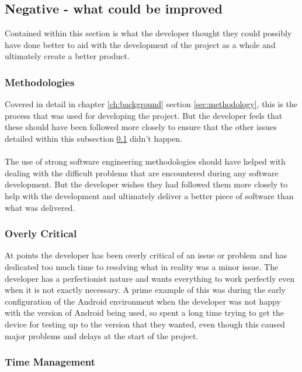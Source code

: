 \subsection{Negative - what could be improved}
\label{sec:negative_personal}

Contained within this section is what the developer thought they could possibly have done better to aid with the development of the project as a whole and ultimately create a better product. 

\subsubsection{Methodologies}

Covered in detail in chapter \ref{ch:background} section \ref{sec:methodology}, this is the process that was used for developing the project. But the developer feels that these should have been followed more closely to ensure that the other issues detailed within this subsection \ref{sec:negative_personal} didn't happen.\\
\\
The use of strong software engineering methodologies should have helped with dealing with the difficult problems that are encountered during any software development. But the developer wishes they had followed them more closely to help with the development and ultimately deliver a better piece of software than what was delivered.

\subsubsection{Overly Critical}

At points the developer has been overly critical of an issue or problem and has dedicated too much time to resolving what in reality was a minor issue. The developer has a perfectionist nature and wants everything to work perfectly even when it is not exactly necessary. A prime example of this was during the early configuration of the Android environment when the developer was not happy with the version of Android being used, so spent a long time trying to get the device for testing up to the version that they wanted, even though this caused major problems and delays at the start of the project.

\subsubsection{Time Management}
\label{sec:time_management}

